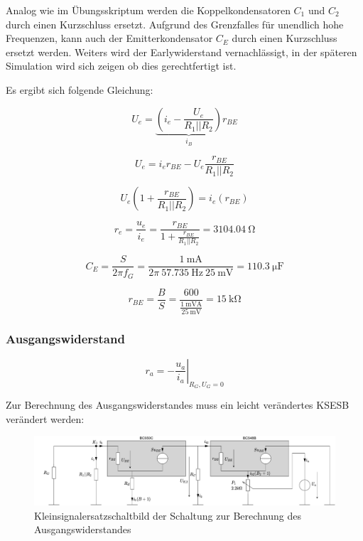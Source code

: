 Analog wie im Übungsskriptum werden die Koppelkondensatoren $C_1$ und $C_2$ durch einen Kurzschluss ersetzt. Aufgrund des Grenzfalles für unendlich hohe Frequenzen, kann auch der Emitterkondensator $C_E$ durch einen Kurzschluss ersetzt werden. Weiters wird der Earlywiderstand vernachlässigt, in der späteren Simulation wird sich zeigen ob dies gerechtfertigt ist.

Es ergibt sich folgende Gleichung:

\begin{equation}
    U_e = \underbrace{\left( i_e - \frac{U_e}{R_1 || R_2}\right)}_{i_B} r_{BE}
\end{equation}

\begin{equation}
    U_e = i_e  r_{BE}  - U_e \frac{r_{BE}}{R_1 || R_2}
\end{equation}

\begin{equation}
    U_e \left( 1 + \frac{r_{BE}}{R_1 || R_2} \right)= i_e \left( r_{BE} \right)
\end{equation}

\begin{equation}
    r_e = \frac{u_e}{i_e} = \frac{r_{BE}}{ 1 + \frac{r_{BE}}{R_1 || R_2} }= \SI{3104.04}{\ohm}
\end{equation}

\begin{equation}
    C_E = \frac{S}{2 \pi f_G} = \frac{\SI{1}{\milli \ampere}}{2 \pi \ \SI{57.735}{\hertz} \ \SI{25}{\milli \volt}} = \SI{110.3}{\micro \farad}
\end{equation}

\begin{equation}
   r_{BE} = \frac{B}{S} = \frac{600}{\frac{\SI{1}{\milli \volt\ampere}}{\SI{25}{\milli\volt}}} = \SI{15}{\kilo \ohm} 
\end{equation}

\subsubsection{Ausgangswiderstand}

\begin{equation}
    r_a = \left. - \frac{u_a}{i_a}\right|_{R_G, U_G = 0}
\end{equation}

Zur Berechnung des Ausgangswiderstandes muss ein leicht verändertes KSESB verändert werden:

\begin{figure}[H]
    \centering
    \includegraphics[width = \textwidth]{tex/1_Microphone/pictures/KSESB_ra.pdf}
    \caption{Kleinsignalersatzschaltbild der Schaltung zur Berechnung des Ausgangswiderstandes}
    \label{fig:my_label}
\end{figure}

